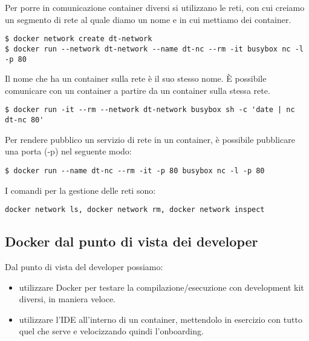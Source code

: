 \noindent Per porre in comunicazione container diversi si utilizzano le reti, con cui creiamo un segmento di rete al quale diamo un nome e in cui mettiamo dei container.

\begin{verbatim}
$ docker network create dt-network
$ docker run --network dt-network --name dt-nc --rm -it busybox nc -l -p 80
\end{verbatim}

\noindent Il nome che ha un container sulla rete è il suo stesso nome. È possibile comunicare con un container a partire da un container sulla stessa rete.

\begin{verbatim}
$ docker run -it --rm --network dt-network busybox sh -c 'date | nc dt-nc 80'
\end{verbatim}

\noindent Per rendere pubblico un servizio di rete in un container, è possibile pubblicare una porta (-p) nel seguente modo:

\begin{verbatim}
$ docker run --name dt-nc --rm -it -p 80 busybox nc -l -p 80
\end{verbatim}

\noindent I comandi per la gestione delle reti sono:

\begin{verbatim}
docker network ls, docker network rm, docker network inspect
\end{verbatim}

\subsection{Docker dal punto di vista dei developer}

Dal punto di vista del developer possiamo:

\begin{itemize}
    \item utilizzare Docker per testare la compilazione/esecuzione con development kit diversi, in maniera veloce.
    \item utilizzare l'IDE all'interno di un container, mettendolo in esercizio con tutto quel che serve e velocizzando quindi l'onboarding.
\end{itemize}